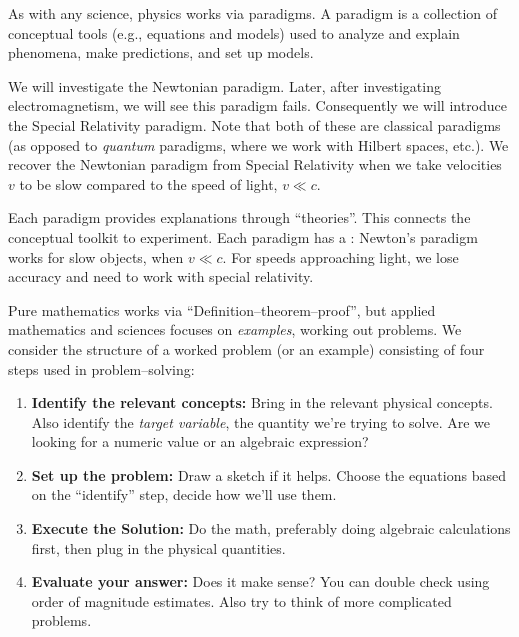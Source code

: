 
 As with any science, physics works via
paradigms. A paradigm is a collection of conceptual tools (e.g.,
equations and models) used to analyze and explain phenomena, make
predictions, and set up models. 

We will investigate the Newtonian paradigm. Later, after
investigating electromagnetism, we will see this paradigm
fails. Consequently we will introduce the Special Relativity
paradigm. Note that both of these are classical paradigms (as
opposed to \emph{quantum} paradigms, where we work with Hilbert
spaces, etc.). We recover the Newtonian paradigm from Special
Relativity when we take velocities $v$ to be slow compared to
the speed of light, $v\ll c$.

Each paradigm provides explanations through ``theories''. This
connects the conceptual toolkit to experiment. Each paradigm has
a : Newton's paradigm works for slow
objects, when $v\ll c$. For speeds approaching light, we lose
accuracy and need to work with special relativity.

 Pure mathematics works via
``Definition--theorem--proof'', but applied mathematics and
sciences focuses on \emph{examples}, working out problems. We
consider the structure of a worked problem (or an example)
consisting of four steps used in problem--solving:
\begin{enumerate}
\item\textbf{Identify the relevant concepts:} Bring in the
  relevant physical concepts. Also identify the \emph{target variable},
  the quantity we're trying to solve. Are we looking for a
  numeric value or an algebraic expression?
\item\textbf{Set up the problem:} Draw a sketch if it
  helps. Choose the equations based on the ``identify'' step,
  decide how we'll use them. 
\item\textbf{Execute the Solution:} Do the math, preferably doing
  algebraic calculations first, then plug in the physical
  quantities. 
\item\textbf{Evaluate your answer:} Does it make sense? You can
  double check using order of magnitude estimates. Also try to
  think of more complicated problems.
\end{enumerate}

